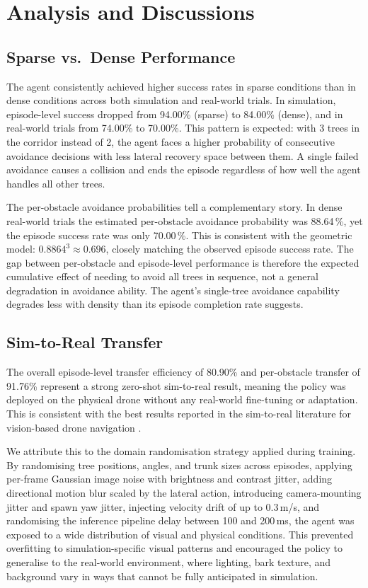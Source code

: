 \documentclass[../main.tex]{subfiles}
\begin{document}
\section{Analysis and Discussions}
\justify

\subsection{Sparse vs.\ Dense Performance}

The agent consistently achieved higher success rates in sparse conditions than in dense conditions across both simulation and real-world trials. In simulation, episode-level success dropped from 94.00\% (sparse) to 84.00\% (dense), and in real-world trials from 74.00\% to 70.00\%. This pattern is expected: with 3 trees in the corridor instead of 2, the agent faces a higher probability of consecutive avoidance decisions with less lateral recovery space between them. A single failed avoidance causes a collision and ends the episode regardless of how well the agent handles all other trees.

The per-obstacle avoidance probabilities tell a complementary story. In dense real-world trials the estimated per-obstacle avoidance probability was 88.64\,\%, yet the episode success rate was only 70.00\,\%. This is consistent with the geometric model: $0.8864^3 \approx 0.696$, closely matching the observed episode success rate. The gap between per-obstacle and episode-level performance is therefore the expected cumulative effect of needing to avoid all trees in sequence, not a general degradation in avoidance ability. The agent's single-tree avoidance capability degrades less with density than its episode completion rate suggests.

\subsection{Sim-to-Real Transfer}

The overall episode-level transfer efficiency of 80.90\% and per-obstacle transfer of 91.76\% represent a strong zero-shot sim-to-real result, meaning the policy was deployed on the physical drone without any real-world fine-tuning or adaptation. This is consistent with the best results reported in the sim-to-real literature for vision-based drone navigation \cite{Loquercio2019,Jang2024,Azzam2024}.

We attribute this to the domain randomisation strategy applied during training. By randomising tree positions, angles, and trunk sizes across episodes, applying per-frame Gaussian image noise with brightness and contrast jitter, adding directional motion blur scaled by the lateral action, introducing camera-mounting jitter and spawn yaw jitter, injecting velocity drift of up to 0.3\,m/s, and randomising the inference pipeline delay between 100 and 200\,ms, the agent was exposed to a wide distribution of visual and physical conditions. This prevented overfitting to simulation-specific visual patterns and encouraged the policy to generalise to the real-world environment, where lighting, bark texture, and background vary in ways that cannot be fully anticipated in simulation.
\end{document}
